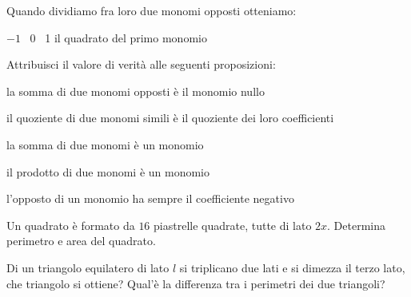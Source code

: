 \begin{esercizio}
\label{ese:9.39}
Quando dividiamo fra loro due monomi opposti otteniamo:
\begin{center}
\quad\(-1\)
\qquad{}\quad~0
\qquad{}\quad~1
\qquad{}\quad il quadrato del primo monomio
\end{center}
\end{esercizio}

\begin{esercizio}
\label{ese:9.40}
Attribuisci il valore di verità alle seguenti proposizioni:
\TabPositions{11cm}
\begin{enumeratea}
\item la somma di due monomi opposti è il monomio nullo \hfill\verofalso
\item il quoziente di due monomi simili è il quoziente dei loro 
coefficienti 
\hfill\verofalso
\item la somma di due monomi è un monomio \hfill\verofalso
\item il prodotto di due monomi è un monomio \hfill\verofalso
\item l'opposto di un monomio ha sempre il coefficiente negativo 
\hfill\verofalso
\end{enumeratea}
\end{esercizio}

\begin{esercizio}
\label{ese:9.41}
Un quadrato è formato da \(16\) piastrelle quadrate, tutte di lato \(2x\). 
Determina perimetro e area del quadrato. 
\end{esercizio}

\begin{esercizio}
\label{ese:9.42}
Di un triangolo equilatero di lato \(l\) si triplicano due lati e 
si dimezza il terzo lato, che triangolo si ottiene? 
Qual'è la differenza tra i perimetri dei due triangoli? 
\end{esercizio}

\subsubsection*{}


